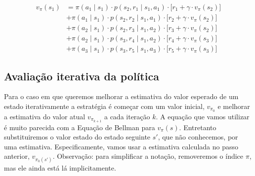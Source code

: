 \documentclass{article}
\begin{document}
            \begin{equation}
                \begin{split}
                    v_\pi(s_1) &= \pi(a_1 \mid s_1) \cdot p(s_2, r_1 \mid s_1, a_1) \cdot \Big[ r_1 + \gamma \cdot v_\pi(s_2) \Big] \\
                               &+ \pi(a_1 \mid s_1) \cdot p(s_2, r_2 \mid s_1, a_1) \cdot \Big[ r_2 + \gamma \cdot v_\pi(s_2) \Big] \\
                               &+ \pi(a_2 \mid s_1) \cdot p(s_2, r_3 \mid s_1, a_2) \cdot \Big[ r_3 + \gamma \cdot v_\pi(s_2) \Big] \\
                               &+ \pi(a_2 \mid s_1) \cdot p(s_3, r_4 \mid s_1, a_2) \cdot \Big[ r_4 + \gamma \cdot v_\pi(s_3) \Big] \\
                               &+ \pi(a_3 \mid s_1) \cdot p(s_3, r_5 \mid s_1, a_3) \cdot \Big[ r_5 + \gamma \cdot v_\pi(s_3) \Big]
                \end{split}
            \end{equation}
        
        \subsection{Avaliação iterativa da política}
        
            Para o caso em que queremos melhorar a estimativa do valor esperado de um estado iterativamente a estratégia é começar com um valor inicial, $v_{\pi_{0}}$ e melhorar a estimativa do valor atual $v_{\pi_{k+1}}$ a cada iteração $k$.
            A equação que vamos utilizar é muito parecida com a Equação de Bellman para $v_{\pi}(s)$. 
            Entretanto substituiremos o valor estado do estado seguinte $s'$, que não conhecemos, por uma estimativa.
            Especificamente, vamos usar a estimativa calculada no passo anterior, $v_{\pi_{k}(s')}$.
            Observação: para simplificar a notação, removeremos o índice $\pi$, mas ele ainda está lá implicitamente.
            
\end{document}
